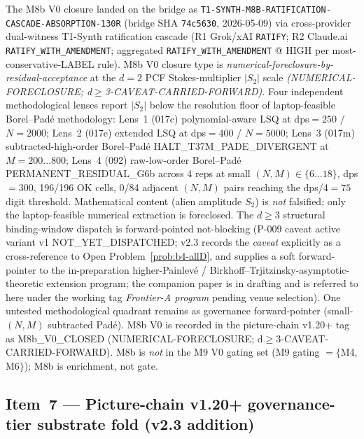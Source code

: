 \documentclass[11pt,a4paper]{article}
\theoremstyle{definition}
\theoremstyle{remark}
\begin{document}
The M8b V0 closure landed on the bridge as
\texttt{T1-SYNTH-M8B-RATIFICATION-CASCADE-ABSORPTION-130R} (bridge
SHA \texttt{74c5630}, 2026-05-09) via cross-provider dual-witness
T1-Synth ratification cascade (R1 Grok/xAI \verb|RATIFY|; R2
Claude.ai \verb|RATIFY_WITH_AMENDMENT|; aggregated
\verb|RATIFY_WITH_AMENDMENT| @ HIGH per most-conservative-LABEL
rule). M8b V0 closure type is
\emph{numerical-foreclosure-by-residual-acceptance} at the $d=2$ PCF
Stokes-multiplier $|S_2|$ scale \emph{(NUMERICAL-FORECLOSURE; d$\geq$3-CAVEAT-CARRIED-FORWARD)}.
Four independent methodological
lenses report $|S_2|$ below the resolution floor of laptop-feasible
Borel--Pad\'e methodology: Lens~1 (017c) polynomial-aware LSQ at
dps$=250$ / $N=2000$; Lens~2 (017e) extended LSQ at dps$=400$ /
$N=5000$; Lens~3 (017m) subtracted-high-order Borel--Pad\'e
\textsf{HALT\_T37M\_PADE\_DIVERGENT} at $M=200{\ldots}800$; Lens~4
(092) raw-low-order Borel--Pad\'e \textsf{PERMANENT\_RESIDUAL\_G6b}
across 4 reps at small $(N,M) \in \{6{\ldots}18\}$, dps$=300$,
196/196 OK cells, 0/84 adjacent $(N,M)$ pairs reaching the
dps/4$=75$ digit threshold. Mathematical content (alien amplitude
$S_2$) is \emph{not} falsified; only the laptop-feasible numerical
extraction is foreclosed. The $d \geq 3$ structural binding-window
dispatch is forward-pointed not-blocking (P-009 caveat active
variant v1 \textsf{NOT\_YET\_DISPATCHED}; v2.3 records the
\emph{caveat} explicitly as a cross-reference to Open
Problem~\ref{prob:b4-allD}, and supplies a soft forward-pointer
to the in-preparation higher-Painlev\'e /
Birkhoff--Trjitzinsky-asymptotic-theoretic extension program; the
companion paper is in drafting and is referred to here under the
working tag \emph{Frontier-A program} pending venue selection). One
untested methodological quadrant remains as governance
forward-pointer (small-$(N,M)$ subtracted Pad\'e). M8b V0 is
recorded in the picture-chain v1.20+ tag as
\textsf{M8b\_V0\_CLOSED (NUMERICAL-FORECLOSURE; d$\geq$3-CAVEAT-CARRIED-FORWARD)}.
M8b is \emph{not} in the M9 V0 gating set (M9 gating $= \{$M4, M6$\}$);
M8b is enrichment, not gate.

\subsection{Item~7 --- Picture-chain v1.20+ governance-tier substrate fold (v2.3 addition)}
\label{sec:closure-cascade-picture}
\end{document}
